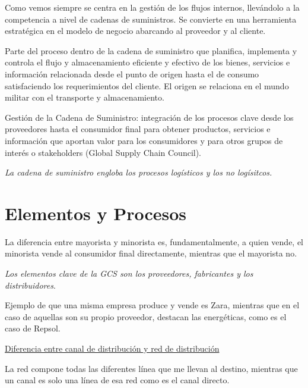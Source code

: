 \documentclass[12pt]{report} %
\begin{document}
Como vemos siempre se centra en la gestión de los flujos internos,
llevándolo a la competencia a nivel de cadenas de suministros. Se
convierte en una herramienta estratégica en el modelo de negocio
abarcando al proveedor y al cliente.

\begin{definicion}[Logística]
Parte del proceso dentro de la cadena de suministro que planifica, implementa y controla el flujo y almacenamiento eficiente y efectivo de los bienes, servicios e información relacionada desde el punto de origen hasta el de consumo satisfaciendo los requerimientos del cliente. El origen se relaciona en el mundo militar con el transporte y almacenamiento.
\end{definicion}

\begin{definicion}
Gestión de la Cadena de Suministro: integración de los procesos clave desde los proveedores hasta el consumidor final para obtener productos, servicios e información que aportan valor para los consumidores y para otros grupos de interés o stakeholders (Global Supply Chain Council).
\end{definicion}

\emph{La cadena de suministro engloba los procesos logísticos y los no
logísitcos.}


\hypertarget{elementos-y-procesos}{%
\section{Elementos y Procesos}\label{elementos-y-procesos}}

La diferencia entre mayorista y minorista es, fundamentalmente, a quien
vende, el minorista vende al consumidor final directamente, mientras que
el mayorista no.

\emph{Los elementos clave de la GCS son los proveedores, fabricantes y
los distribuidores}.

Ejemplo de que una misma empresa produce y vende es Zara, mientras que
en el caso de aquellas son su propio proveedor, destacan las
energéticas, como es el caso de Repsol.

\underline{Diferencia entre canal de distribución y red de distribución}

La red compone todas las diferentes línea que me llevan al destino,
mientras que un canal es solo una línea de esa red como es el canal
directo.
\end{document}
